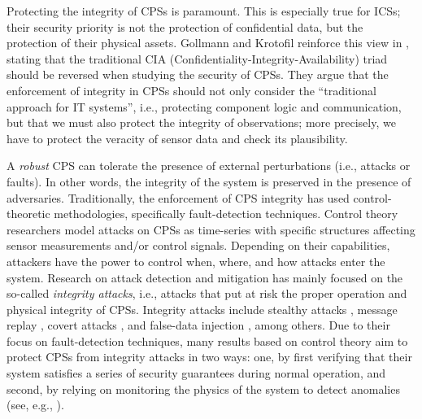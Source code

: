 {

{%
Protecting the integrity of CPSs is paramount. This is especially true for ICSs; their security priority is not the protection of confidential data, but the protection of their physical assets. Gollmann and Krotofil reinforce this view in \cite{CPSSec}, stating that the traditional CIA (Confidentiality-Integrity-Availability) triad should be reversed when studying the security of CPSs. They argue that the enforcement of integrity in CPSs should not only consider the ``traditional approach for IT systems'', {i.e.}, protecting {component logic} and {communication}, but that we must also protect the integrity of {observations}; more precisely, we have to protect the {veracity} of sensor data and check its {plausibility}.} 

A \emph{robust} CPS can tolerate the presence of external perturbations (i.e., attacks or faults). In other words, the integrity of the system is preserved in the presence of adversaries. Traditionally, the enforcement of CPS integrity has  used {control-theoretic methodologies}, specifically {fault-detection techniques}. Control theory researchers model attacks on CPSs as time-series with specific structures affecting sensor measurements and/or control signals. Depending on their capabilities, attackers have the power to control when, where, and how attacks enter the system. Research on attack detection and mitigation has mainly focused on the so-called \emph{integrity attacks}, i.e., attacks that put at risk the proper operation and physical integrity of CPSs. Integrity attacks include stealthy attacks \cite{CPSStealthAttacks}, message replay \cite{CPSReplayAttacks}, covert attacks \cite{CPSCovertAttacks}, and false-data injection \cite{CPSDataInjectionAttacks}, among others. Due to their focus on fault-detection techniques, many results based on control theory aim to protect CPSs from integrity attacks in two ways: one, by first verifying that their system satisfies a series of security guarantees during {normal operation}, and second, by relying on {monitoring} the physics of the system to detect anomalies (see, e.g., \cite{CPSInvariantsForDetection,Urbina2016,CPSAttackDetection,CPSAttacksAgainstPCS,CPSIntegrityAttacks,CPSDetectingIntegrityAttacksScada}). 

}
